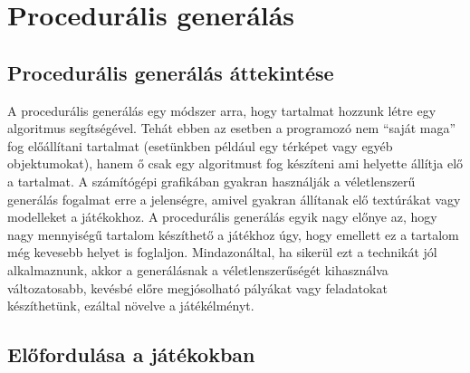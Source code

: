 \chapter{Procedurális generálás}

\section{Procedurális generálás áttekintése}

\noindent A procedurális generálás egy módszer arra, hogy tartalmat hozzunk létre egy algoritmus segítségével. Tehát ebben az esetben a programozó nem “saját maga” fog előállítani tartalmat (esetünkben például egy térképet vagy egyéb objektumokat), hanem ő csak egy algoritmust fog készíteni ami helyette állítja elő a tartalmat. A számítógépi grafikában gyakran használják a véletlenszerű generálás fogalmat erre a jelenségre, amivel gyakran állítanak elő textúrákat vagy modelleket a játékokhoz. A procedurális generálás egyik nagy előnye az,  hogy nagy mennyiségű tartalom készíthető a játékhoz úgy, hogy emellett ez a tartalom még kevesebb helyet is foglaljon. Mindazonáltal, ha sikerül ezt a technikát jól alkalmaznunk, akkor a generálásnak a véletlenszerűségét kihasználva változatosabb, kevésbé előre megjósolható pályákat vagy feladatokat készíthetünk, ezáltal növelve a játékélményt.  

\section{Előfordulása a játékokban}

